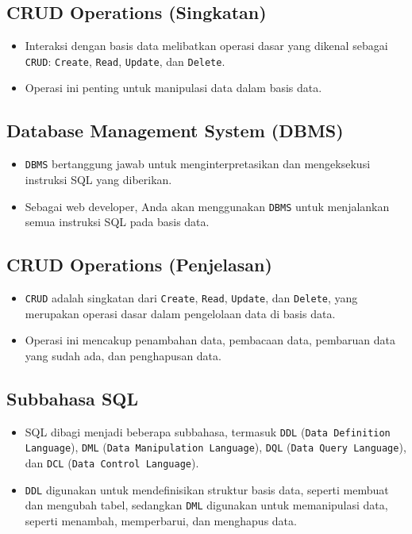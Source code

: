 \documentclass{article}
\begin{document}
\subsection{CRUD Operations (Singkatan)}
\begin{itemize}
    \item Interaksi dengan basis data melibatkan operasi dasar yang dikenal sebagai \texttt{CRUD}: \texttt{Create}, \texttt{Read}, \texttt{Update}, dan \texttt{Delete}.
    \item Operasi ini penting untuk manipulasi data dalam basis data.
\end{itemize}

\subsection{Database Management System (DBMS)}
\begin{itemize}
    \item \texttt{DBMS} bertanggung jawab untuk menginterpretasikan dan mengeksekusi instruksi SQL yang diberikan.
    \item Sebagai web developer, Anda akan menggunakan \texttt{DBMS} untuk menjalankan semua instruksi SQL pada basis data.
\end{itemize}

\subsection{CRUD Operations (Penjelasan)}
\begin{itemize}
    \item \texttt{CRUD} adalah singkatan dari \texttt{Create}, \texttt{Read}, \texttt{Update}, dan \texttt{Delete}, yang merupakan operasi dasar dalam pengelolaan data di basis data.
    \item Operasi ini mencakup penambahan data, pembacaan data, pembaruan data yang sudah ada, dan penghapusan data.
\end{itemize}

\subsection{Subbahasa SQL}
\begin{itemize}
    \item SQL dibagi menjadi beberapa subbahasa, termasuk \texttt{DDL} (\texttt{Data Definition Language}), \texttt{DML} (\texttt{Data Manipulation Language}), \texttt{DQL} (\texttt{Data Query Language}), dan \texttt{DCL} (\texttt{Data Control Language}).
    \item \texttt{DDL} digunakan untuk mendefinisikan struktur basis data, seperti membuat dan mengubah tabel, sedangkan \texttt{DML} digunakan untuk memanipulasi data, seperti menambah, memperbarui, dan menghapus data.
\end{itemize}
\end{document}

